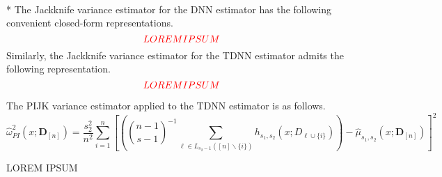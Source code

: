 \begin{boxD}
	\begin{thm}\label{thm:JK_closed_form}\mbox{}\\*
		The Jackknife variance estimator for the DNN estimator has the following convenient closed-form representations.
		\begin{equation}
			{\color{red} LOREM IPSUM}
		\end{equation}
		Similarly, the Jackknife variance estimator for the TDNN estimator admits the following representation.
		\begin{equation}
			{\color{red} LOREM IPSUM}
		\end{equation}
	\end{thm}
\end{boxD}


The PIJK variance estimator applied to the TDNN estimator is as follows.
\begin{equation}\label{eq:PIJK_Var_Est}
	\hat{\omega}_{PI}^2\left(x; \mathbf{D}_{[n]}\right)
	= \frac{s_2^2}{n^2}\sum_{i = 1}^{n}\left[\left(
		\binom{n-1}{s-1}^{-1} \sum_{\ell \in L_{s_2-1}([n]\backslash\{i\})} h_{s_1, s_2}\left(x; D_{\ell \cup \{i\}}\right)\right)
		- \hat{\mu}_{s_1, s_2}\left(x; \mathbf{D}_{[n]}\right)\right]^2
\end{equation}

{\color{red} LOREM IPSUM}

